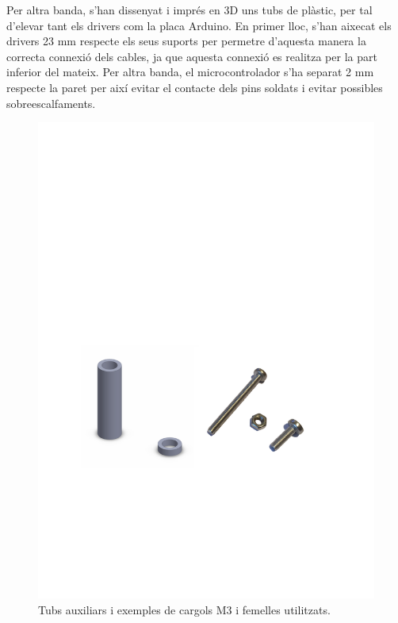 Per altra banda, s'han dissenyat i imprés en 3D uns tubs de plàstic, per tal d’elevar tant els drivers com la placa Arduino. En primer lloc, s’han aixecat els drivers 23 mm respecte els seus suports per permetre d’aquesta manera la correcta connexió dels cables, ja que aquesta connexió es realitza per la part inferior del mateix. Per altra banda, el microcontrolador s’ha separat 2 mm respecte la paret per així evitar el contacte dels pins soldats i evitar possibles sobreescalfaments. 

\begin{figure}[H]
	\centering
	\includegraphics{tubs}
	\caption{Tubs auxiliars i exemples de cargols M3 i femelles utilitzats.}
	\label{fig:tubs}
\end{figure}
